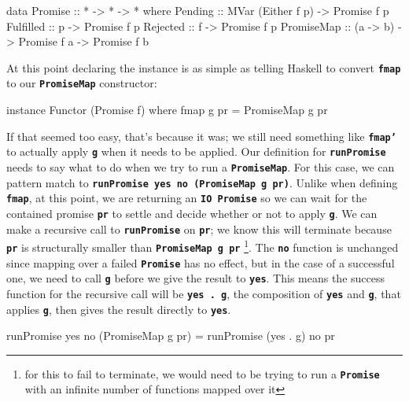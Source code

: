 \documentclass[12pt, english, letterpaper]{kuthesis}
\newcommand{\lit}[1]{\textbf{\texttt{#1}}}
\begin{document}
\begin{code}
data Promise :: * -> * -> * where
    Pending :: MVar (Either f p) -> Promise f p
    Fulfilled :: p -> Promise f p
    Rejected :: f -> Promise f p
    PromiseMap :: (a -> b) -> Promise f a -> Promise f b
\end{code}

At this point declaring the instance is as simple as telling Haskell to convert \lit{fmap} to our \lit{PromiseMap} constructor:
\begin{code}
instance Functor (Promise f) where
    fmap g pr = PromiseMap g pr
\end{code}
If that seemed too easy, that's because it was; we still need something like \lit{fmap'} to actually apply \lit g when it needs to be applied.  Our definition for \lit{runPromise} needs to say what to do when we try to run a \lit{PromiseMap}.  For this case, we can pattern match to \lit{runPromise yes no (PromiseMap g pr)}.  Unlike when defining \lit{fmap}, at this point, we are returning an \lit{IO Promise} so we can wait for the contained promise \lit{pr} to settle and decide whether or not to apply \lit g.  We can make a recursive call to \lit{runPromise} on \lit{pr}; we know this will terminate because \lit{pr} is structurally smaller than \lit{PromiseMap g pr} \footnote{for this to fail to terminate, we would need to be trying to run a \lit{Promise} with an infinite number of functions mapped over it}.  The \lit{no} function is unchanged since mapping over a failed \lit{Promise} has no effect, but in the case of a successful one, we need to call \lit g before we give the result to \lit{yes}.  This means the success function for the recursive call will be \lit{yes . g}, the composition of \lit{yes} and \lit g, that applies \lit g, then gives the result directly to \lit{yes}.
\begin{code}
runPromise yes no (PromiseMap g pr) = runPromise (yes . g) no pr
\end{code}
\end{document}
